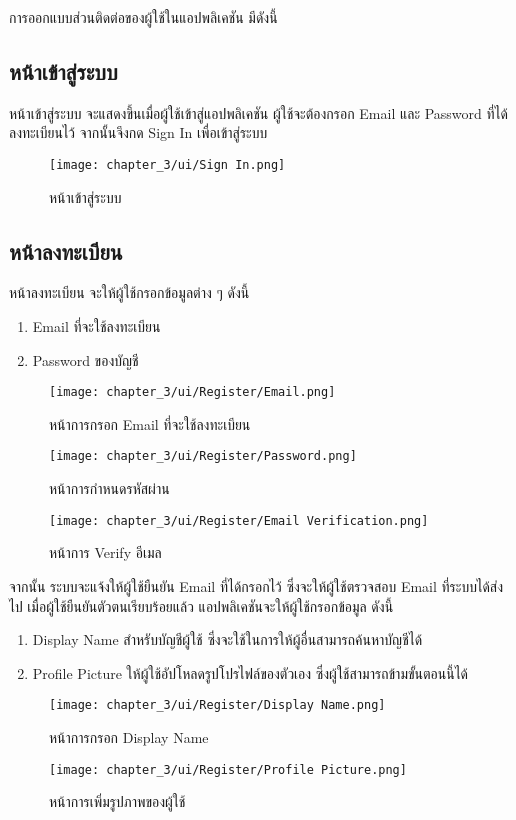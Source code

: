 การออกแบบส่วนติดต่อของผู้ใช้ในแอปพลิเคชัน มีดังนี้
\subsection{หน้าเข้าสู่ระบบ}
หน้าเข้าสู่ระบบ จะแสดงขึ้นเมื่อผู้ใช้เข้าสู่แอปพลิเคชัน ผู้ใช้จะต้องกรอก Email และ Password ที่ได้ลงทะเบียนไว้ จากนั้นจึงกด Sign In เพื่อเข้าสู่ระบบ
\begin{figure}
    \texttt{[image: chapter\_3/ui/Sign In.png]}
    \caption{หน้าเข้าสู่ระบบ}
\end{figure}

\subsection{หน้าลงทะเบียน}
หน้าลงทะเบียน จะให้ผู้ใช้กรอกข้อมูลต่าง ๆ ดังนี้
\begin{enumerate}
    \item Email ที่จะใช้ลงทะเบียน
    \item Password ของบัญชี
\end{enumerate}
\begin{figure}
    \texttt{[image: chapter\_3/ui/Register/Email.png]}
    \caption{หน้าการกรอก Email ที่จะใช้ลงทะเบียน}
\end{figure}
\begin{figure}
    \texttt{[image: chapter\_3/ui/Register/Password.png]}
    \caption{หน้าการกำหนดรหัสผ่าน}
\end{figure}
\begin{figure}
    \texttt{[image: chapter\_3/ui/Register/Email Verification.png]}
    \caption{หน้าการ Verify อีเมล}
\end{figure}
\indent จากนั้น ระบบจะแจ้งให้ผู้ใช้ยืนยัน Email ที่ได้กรอกไว้ ซึ่งจะให้ผู้ใช้ตรวจสอบ Email ที่ระบบได้ส่งไป เมื่อผู้ใช้ยืนยันตัวตนเรียบร้อยแล้ว 
แอปพลิเคชันจะให้ผู้ใช้กรอกข้อมูล ดังนี้
\begin{enumerate}
    \item Display Name สำหรับบัญชีผู้ใช้ ซึ่งจะใช้ในการให้ผู้อื่นสามารถค้นหาบัญชีได้
    \item Profile Picture ให้ผู้ใช้อัปโหลดรูปโปรไฟล์ของตัวเอง ซึ่งผู้ใช้สามารถข้ามขั้นตอนนี้ได้
\end{enumerate}
\begin{figure}
    \texttt{[image: chapter\_3/ui/Register/Display Name.png]}
    \caption{หน้าการกรอก Display Name}
\end{figure}
\begin{figure}
    \texttt{[image: chapter\_3/ui/Register/Profile Picture.png]}
    \caption{หน้าการเพิ่มรูปภาพของผู้ใช้}
\end{figure}

